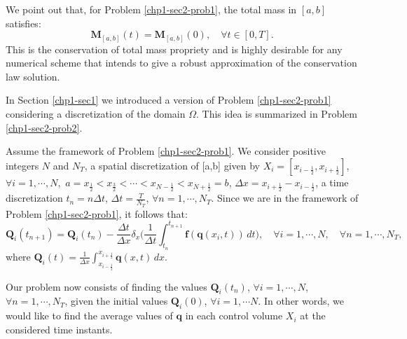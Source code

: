 We point out that, for Problem \ref{chp1-sec2-prob1}, 
the total mass in $[a,b]$ satisfies: 
\begin{equation}
	\mathbf{M}_{[a,b]}(t) = \mathbf{M}_{[a,b]}(0), \quad \forall t \in [0,T].
\end{equation}
This is the conservation of total mass propriety and is highly desirable
for any numerical scheme that intends to give a robust approximation of the 
conservation law solution.

In Section \ref{chp1-sec1} we introduced a version of Problem \ref{chp1-sec2-prob1}
considering a discretization of the domain $\Omega$. 
This idea is summarized in Problem \ref{chp1-sec2-prob2}.
\begin{prob}
        \label{chp1-sec2-prob2}
	Assume the framework of Problem \ref{chp1-sec2-prob1}.
        We consider positive integers $N$ and $N_T$, a spatial discretization of [a,b] given by
        $X_i = [x_{i-\frac{1}{2}}, x_{i+\frac{1}{2}}]$,
        $\forall i = 1, \cdots, N,$ 
	$a = x_{\frac{1}{2}} < x_{\frac{3}{2}} < \cdots < x_{N-\frac{1}{2}} < x_{N+\frac{1}{2}} = b$,
	$\Delta x = x_{i+\frac{1}{2}}-x_{i-\frac{1}{2}}$,
	a time discretization
        $t_n = n\Delta t$, $\Delta t = \frac{T}{N_T}$, $\forall n = 1, \cdots, N_T$.
	Since we are in the framework of Problem \ref{chp1-sec2-prob1}, it follows that:
        \begin{equation*}
                \mathbf{Q}_i(t_{n+1}) =  \mathbf{Q}_i(t_n) -
                \frac{\Delta t}{\Delta x} \delta _x\bigg( \frac{1}{\Delta t}\int_{t_n}^{t_{n+1}}
                \mathbf{f}(\mathbf{q}(x_{i}, t)) \,dt \bigg),
                \quad \forall i = 1, \cdots, N,
                \quad \forall n = 1, \cdots, N_T,
        \end{equation*}
        where $\mathbf{Q}_i(t) = \frac{1}{\Delta x}
        \int_{x_{i-\frac{1}{2}}}^{x_{i+\frac{1}{2}}} \mathbf{q}(x,t) \,dx$.
	
	Our problem now consists of finding the values $\mathbf{Q}_i(t_{n})$, 
	$\forall i = 1, \cdots, N$, $\forall n = 1, \cdots, N_T$,
	given the initial values $\mathbf{Q}_i(0)$, $\forall i = 1, \cdots N$.
	In other words, we would like to find the average values of $\mathbf{q}$
	in each control volume $X_i$ at the considered time instants.
\end{prob}

